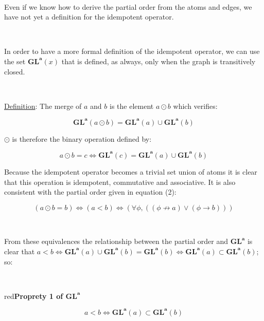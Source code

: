 \documentclass[a4paper, 11pt]{article}
\begin{document}
\

Even if we know how to derive the partial order from the atoms and edges, we have not yet a definition for the idempotent operator. 

\

In order to have a more formal definition of the idempotent operator, we can use the set $\boldsymbol{GL}^{\boldsymbol{a}} (x)$ that is defined, as always, only when the graph is transitively closed. 

\

\begin{tcolorbox}
\underline{Definition}: The merge of $a$ and $b$ is the element $a \odot b$ which verifies:

\begin{equation}
    \boldsymbol{GL}^{\boldsymbol{a}}(a \odot b) = \boldsymbol{GL}^{\boldsymbol{a}}(a) \cup \boldsymbol{GL}^{\boldsymbol{a}}(b)
\end{equation}

$\odot$ is therefore the binary operation defined by:

\begin{equation*}
    a \odot b = c \Leftrightarrow \boldsymbol{GL}^{\boldsymbol{a}}(c) = \boldsymbol{GL}^{\boldsymbol{a}}(a) \cup \boldsymbol{GL}^{\boldsymbol{a}}(b)
\end{equation*}

\end{tcolorbox}

Because the idempotent operator becomes a trivial set union of atoms it is clear that this operation is idempotent, commutative and associative. It is also consistent with
the partial order given in equation (2):

\begin{equation*}
    (a \odot b = b) \Leftrightarrow (a < b) \Leftrightarrow (\forall \phi, ((\phi \not\rightarrow a) \lor (\phi \rightarrow b)))
\end{equation*}

\

From these equivalences the relationship between the partial order and $\boldsymbol{GL}^{\boldsymbol{a}}$ is clear that $a < b \Leftrightarrow \boldsymbol{GL}^{\boldsymbol{a}}(a) \cup \boldsymbol{GL}^{\boldsymbol{a}}(b) = \boldsymbol{GL}^{\boldsymbol{a}}(b) \Leftrightarrow \boldsymbol{GL}^{\boldsymbol{a}}(a) \subset \boldsymbol{GL}^{\boldsymbol{a}}(b)$; so:

\

\begin{mybox}{red}{\textbf{Proprety 1 of $\boldsymbol{GL}^{\boldsymbol{a}}$}}


\begin{equation}
    a < b \Leftrightarrow \boldsymbol{GL}^{\boldsymbol{a}}(a) \subset \boldsymbol{GL}^{\boldsymbol{a}}(b)
\end{equation}

\end{mybox}
\end{document}

